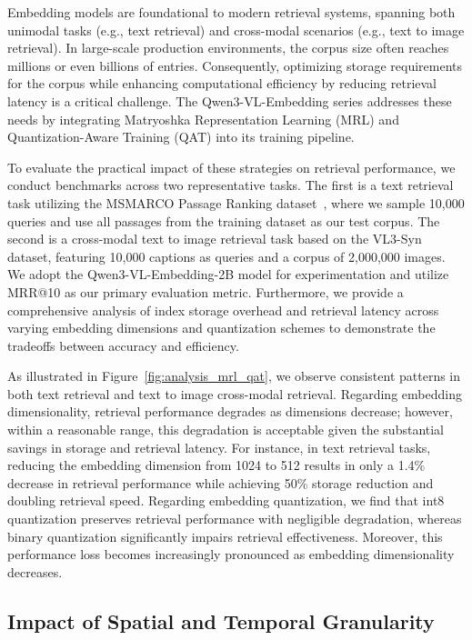 \documentclass{article} %
\begin{document}
Embedding models are foundational to modern retrieval systems, spanning both unimodal tasks (e.g., text retrieval) and cross-modal scenarios (e.g., text to image retrieval). In large-scale production environments, the corpus size often reaches millions or even billions of entries. Consequently, optimizing storage requirements for the corpus while enhancing computational efficiency by reducing retrieval latency is a critical challenge. The Qwen3-VL-Embedding series addresses these needs by integrating Matryoshka Representation Learning (MRL) and Quantization-Aware Training (QAT) into its training pipeline.

To evaluate the practical impact of these strategies on retrieval performance, we conduct benchmarks across two representative tasks. The first is a text retrieval task utilizing the MSMARCO Passage Ranking dataset~\citep{msmarco}, where we sample 10,000 queries and use all passages from the training dataset as our test corpus. The second is a cross-modal text to image retrieval task based on the VL3-Syn~\citep{videollama3} dataset, featuring 10,000 captions as queries and a corpus of 2,000,000 images. We adopt the Qwen3-VL-Embedding-2B model for experimentation and utilize MRR@10 as our primary evaluation metric. Furthermore, we provide a comprehensive analysis of index storage overhead and retrieval latency across varying embedding dimensions and quantization schemes to demonstrate the tradeoffs between accuracy and efficiency.

As illustrated in Figure~\ref{fig:analysis_mrl_qat}, we observe consistent patterns in both text retrieval and text to image cross-modal retrieval. Regarding embedding dimensionality, retrieval performance degrades as dimensions decrease; however, within a reasonable range, this degradation is acceptable given the substantial savings in storage and retrieval latency. For instance, in text retrieval tasks, reducing the embedding dimension from 1024 to 512 results in only a 1.4\% decrease in retrieval performance while achieving 50\% storage reduction and doubling retrieval speed. Regarding embedding quantization, we find that int8 quantization preserves retrieval performance with negligible degradation, whereas binary quantization significantly impairs retrieval effectiveness. Moreover, this performance loss becomes increasingly pronounced as embedding dimensionality decreases.

\subsection{Impact of Spatial and Temporal Granularity}
\end{document}
